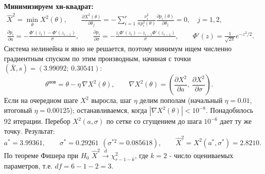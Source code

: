 \documentclass[12pt]{spbstu-task}
\begin{document}
\textbf{Минимизируем хи-квадрат:}
\begin{gather*}
  \hat{X}^2 = \min_\theta X^2(\theta),\qquad
  \frac{\partial X^2(\theta)}{\partial\theta_j}
  = -\sum_{i=1}^{r}\frac{\nu_i^2}{np_i^2(\theta)}\frac{\partial p_i(\theta)}{\partial\theta_j} = 0,\quad j = 1, 2,\\
  \frac{\partial p_i}{\partial a} = -\frac{\Phi'(z_i) - \Phi'(z_{i-1})}{\sigma},\qquad
  \frac{\partial p_i}{\partial\sigma} = -\frac{z_i\Phi'(z_i) - z_{i-1}\Phi'(z_{i-1})}{\sigma},\qquad
  \Phi'(z) = \frac{1}{\sqrt{2\pi}}e^{-z^2/2}.
\end{gather*}
Система нелинейна и явно не решается, поэтому минимум ищем численно градиентным спуском
по этим производным, начиная с точки \((\bar{X}, s) = (3.99092;\ 0.30541)\):
\begin{displaymath}
  \theta^{\text{нов}} = \theta - \eta\,\nabla X^2(\theta),\qquad
  \nabla X^2(\theta) = \left(\frac{\partial X^2}{\partial a},\ \frac{\partial X^2}{\partial\sigma}\right).
\end{displaymath}
Если на очередном шаге \(X^2\) выросла, шаг \(\eta\) делим пополам (начальный \(\eta = 0.01\), итоговый \(\eta = 0.00125\));
останавливаемся, когда \(\left|\nabla X^2(\theta)\right| < 10^{-8}\). Понадобилось 92 итерации.
Перебор \(X^2(a, \sigma)\) по сетке со сгущением до шага \(10^{-6}\) дает ту же точку.
Результат:
\begin{displaymath}
  a^* = 3.99361,\qquad \sigma^* = 0.29261\ \ (\sigma^{*2} = 0.085618),\qquad \hat{X}^2 = X^2(a^*, \sigma^*) = 2.8210.
\end{displaymath}
По теореме Фишера при \(H_0\) \(\hat{X}^2 \xrightarrow{d} \chi^2_{r - 1 - k}\), где \(k = 2\) - число оцениваемых
параметров, т.е. \(df = 6 - 1 - 2 = 3\).
\end{document}

